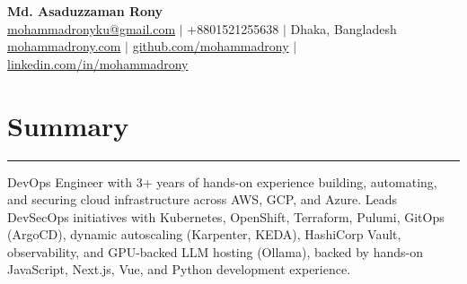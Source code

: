 \documentclass[a4paper,10pt]{article}
\begin{document}
\begin{center}
    {\LARGE \textbf{Md. Asaduzzaman Rony}}\\
    \vspace{2pt}
    \href{mailto:mohammadronyku@gmail.com}{mohammadronyku@gmail.com} $\vert$
    +8801521255638 $\vert$
    Dhaka, Bangladesh\\
    \href{https://mohammadrony.com}{mohammadrony.com} $\vert$
    \href{https://github.com/mohammadrony}{github.com/mohammadrony} $\vert$
    \href{https://www.linkedin.com/in/mohammadrony/}{linkedin.com/in/mohammadrony}
\end{center}

\vspace{-6pt}
\section*{Summary}
\hrule
\vspace{2pt}
DevOps Engineer with 3+ years of hands-on experience building, automating, and securing cloud infrastructure across AWS, GCP, and Azure. Leads DevSecOps initiatives with Kubernetes, OpenShift, Terraform, Pulumi, GitOps (ArgoCD), dynamic autoscaling (Karpenter, KEDA), HashiCorp Vault, observability, and GPU-backed LLM hosting (Ollama), backed by hands-on JavaScript, Next.js, Vue, and Python development experience.

\vspace{-4pt}
\end{document}
